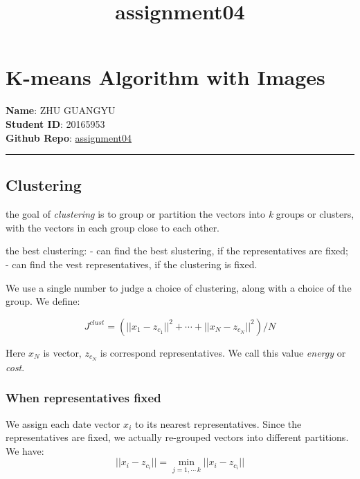 \documentclass[11pt]{article}
\title{assignment04}
\begin{document}
    
    
    \maketitle
    
    

    
    \section{K-means Algorithm with
Images}\label{k-means-algorithm-with-images}

\textbf{Name}: ZHU GUANGYU\\
\textbf{Student ID}: 20165953\\
\textbf{Github Repo}:
\href{https://github.com/z1ggy-o/cv_assignment/tree/master/assignment04}{assignment04}

\begin{center}\rule{0.5\linewidth}{\linethickness}\end{center}

\subsection{Clustering}\label{clustering}

the goal of \emph{clustering} is to group or partition the vectors into
\emph{k} groups or clusters, with the vectors in each group close to
each other.

the best clustering: - can find the best slustering, if the
representatives are fixed; - can find the vest representatives, if the
clustering is fixed.

We use a single number to judge a choice of clustering, along with a
choice of the group. We define:

\[
J^{clust}=(||x_{1}-z_{c_{1}}||^{2}+ \cdots +||x_{N}-z_{c_{N}}||^{2})/N
\]

Here \(x_{N}\) is vector, \(z_{c_{N}}\) is correspond representatives.
We call this value \emph{energy} or \emph{cost}.

\subsubsection{When representatives
fixed}\label{when-representatives-fixed}

We assign each date vector \(x_{i}\) to its nearest representatives.
Since the representatives are fixed, we actually re-grouped vectors into
different partitions. We have:
\[ ||x_{i}-z_{c_{i}}|| = \min_{j=1,\cdots\,k}||x_{i}-z_{c_{i}}|| \]
\end{document}

